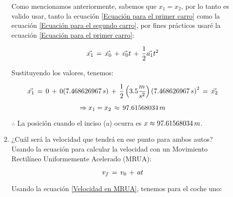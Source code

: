 \documentclass[letterpaper, 12pt]{article}
\begin{document}
\begin{enumerate}
\begin{enumerate}
            Como mencionamos anteriormente, sabemos que $x_{1} = x_{2}$, por lo tanto es valido usar, tanto la ecuación \ref{Ecuación para el primer carro} como la ecuación \ref{Ecuación para el segundo carro}, por fines prácticos usaré la ecuación \ref{Ecuación para el primer carro}:
            
            \begin{equation*}
                \vec{x_{1}} \thinspace  = \thinspace \vec{x_{0}} \thinspace + \thinspace \vec{v_{0}} t  \thinspace + \thinspace \frac{1}{2}\vec{a_{1}} t^2
            \end{equation*}
            
            Sustituyendo los valores, tenemos:
            
            \begin{equation*}
                \vec{x_{1}} \thinspace = \thinspace 0 \thinspace + \thinspace 0(7.468626967 \thinspace s) \thinspace + \thinspace \frac{1}{2} \left(3.5 \frac{m}{s^{2}} \right) \left(7.468626967 \thinspace s\right)^{2} \thinspace = \thinspace \vec{x_{2}}
            \end{equation*}
            
            \begin{equation}
                \label{Solución numérica del inciso b}
                \Rightarrow x_{1} = x_{2} \thinspace \approx \thinspace 97.61568034 \thinspace m
            \end{equation}
            
            $\therefore$ \thinspace La posición cuando el inciso (a) ocurra es $x \approx 97.61568034 \thinspace m$. \\
            
            \item ¿Cuál será la velocidad que tendrá en ese punto para ambos autos?\\
            
            Usando la ecuación para calcular la velocidad con un Movimiento Rectilíneo Uniformemente Acelerado (MRUA):
            
            \begin{equation}
                \label{Velocidad en MRUA}
                v_{f} \thinspace = \thinspace v_{0} \thinspace + \thinspace at
            \end{equation}
            
            Usando la ecuación \ref{Velocidad en MRUA}, tenemos para el coche uno: 
            

\end{enumerate}
\end{enumerate}
\end{document}
